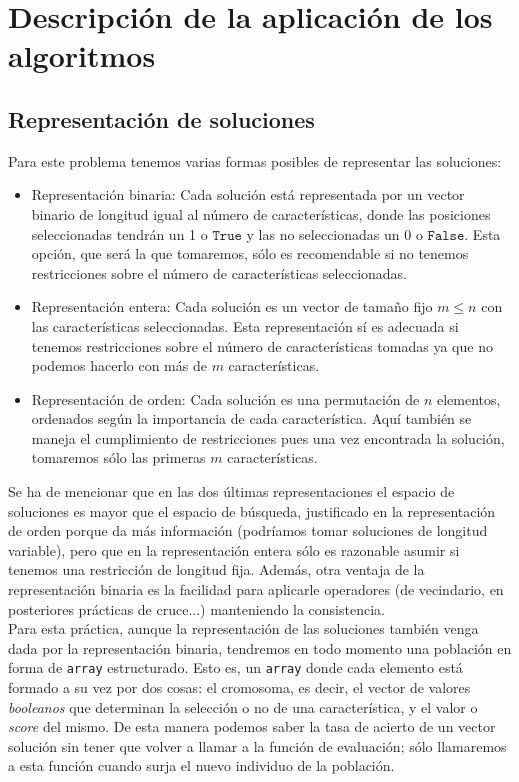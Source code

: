 \documentclass[11pt,leqno]{article}
\begin{document}
\section{Descripción de la aplicación de los algoritmos}
\subsection{Representación de soluciones}
	Para este problema tenemos varias formas posibles de representar las soluciones:
	\begin{itemize}
		\item Representación binaria: Cada solución está representada por un vector binario de longitud igual al número de características, donde las posiciones seleccionadas tendrán un 1 o $\texttt{True}$ y las no seleccionadas un 0 o $\texttt{False}$. Esta opción, que será la que tomaremos, sólo es recomendable si no tenemos restricciones sobre el número de características seleccionadas.
		\item Representación entera: Cada solución es un vector de tamaño fijo $m \leq n$ con las características seleccionadas. Esta representación sí es adecuada si tenemos restricciones sobre el número de características tomadas ya que no podemos hacerlo con más de $m$ características.
		\item Representación de orden: Cada solución es una permutación de $n$ elementos, ordenados según la importancia de cada característica. Aquí también se maneja el cumplimiento de restricciones pues una vez encontrada la solución, tomaremos sólo las primeras $m$ características.
	\end{itemize}
	Se ha de mencionar que en las dos últimas representaciones el espacio de soluciones es mayor que el espacio de búsqueda, justificado en la representación de orden porque da más información (podríamos tomar soluciones de longitud variable), pero que en la representación entera sólo es razonable asumir si tenemos una restricción de longitud fija. Además, otra ventaja de la representación binaria es la facilidad para aplicarle operadores (de vecindario, en posteriores prácticas de cruce...) manteniendo la consistencia.\\
	Para esta práctica, aunque la representación de las soluciones también venga dada por la representación binaria, tendremos en todo momento una población en forma de \texttt{array} estructurado. Esto es, un \texttt{array} donde cada elemento está formado a su vez por dos cosas: el cromosoma, es decir, el vector de valores \textit{booleanos} que determinan la selección o no de una característica, y el valor o \textit{score} del mismo. De esta manera podemos saber la tasa de acierto de un vector solución sin tener que volver a llamar a la función de evaluación; sólo llamaremos a esta función cuando surja el nuevo individuo de la población.
\end{document}
